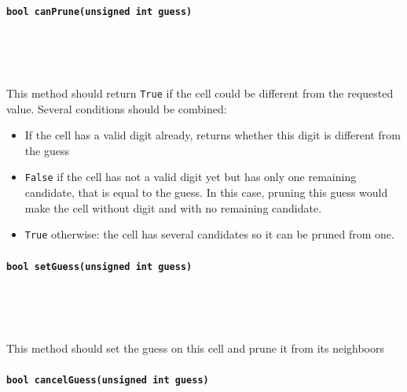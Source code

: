 \documentclass{ecnreport}
\begin{document}
\paragraph{\texttt{bool canPrune(unsigned int guess)}}~\\

 \begin{minipage}{.5cm}
~
 \end{minipage}
 \begin{minipage}{0.9\linewidth}
This method should return \texttt{True} if the cell could be different from the requested value. Several conditions should be combined:
\begin{itemize}
 \item If the cell has a valid digit already, returns whether this digit is different from the guess
 \item \texttt{False} if the cell has not a valid digit yet but has only one remaining candidate, that is equal to the guess. In this case, pruning this guess would make the cell without digit and with no remaining candidate.
 \item \texttt{True} otherwise: the cell has several candidates so it can be pruned from one.
\end{itemize}
 \end{minipage}


 \paragraph{\texttt{bool setGuess(unsigned int guess)}}~\\

 \begin{minipage}{.5cm}
~
 \end{minipage}
 \begin{minipage}{0.9\linewidth}
This method should set the guess on this cell and prune it from its neighboors
 \end{minipage}

  \paragraph{\texttt{bool cancelGuess(unsigned int guess)}}~\\
\end{document}
